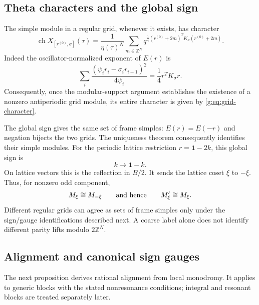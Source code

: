 \documentclass[11pt,a4paper]{article}
\numberwithin{equation}{section}
\theoremstyle{definition}\newtheorem{definition}[theorem]{Definition}
\theoremstyle{remark}\newtheorem{remark}[theorem]{Remark}
\begin{document}
\subsection{Theta characters and the global sign}
The simple module in a regular grid, whenever it exists, has character
\begin{equation}
 \boxed{\qquad
 \operatorname{ch}X_{[r^{(0)},\sigma]}(\tau)
    =\frac1{\eta(\tau)^N}
      \sum_{m\in\mathbb Z^N}
       q^{\frac14(r^{(0)}+2m)^TK_\sigma(r^{(0)}+2m)}.
 \qquad}                                                     \label{g:eq:grid-character}
\end{equation}
Indeed the oscillator-normalized exponent of $E(r)$ is
\[
 \sum_i\frac{(\psi_i r_i-\sigma_i r_{i+1})^2}{4\psi_i}
                         =\frac14r^TK_\sigma r.
\]
Consequently, once the modular-support argument establishes the
existence of a nonzero antiperiodic grid module, its entire character
is given by \eqref{g:eq:grid-character}.

The global sign gives the same set of frame simples:
$E(r)=E(-r)$ and negation bijects the two grids. The uniqueness
theorem consequently identifies their simple modules. For the
periodic lattice restriction $r=\mathbf1-2k$, this global sign is
\[
                       k\longmapsto\mathbf1-k.
\]
On lattice vectors this is the reflection in $B/2$.
It sends the lattice coset $\xi$ to $-\xi$. Thus, for nonzero odd
component,
\[
                 M_\xi\cong M_{-\xi}
                 \qquad\hbox{and hence}\qquad M_\xi'\cong M_\xi.
\]
Different regular grids can agree as sets of frame simples only
under the sign/gauge identifications described next. A coarse label
alone does not identify different parity lifts modulo $2\mathbb Z^N$.

\subsection{Alignment and canonical sign gauges}
The next proposition derives rational alignment from local
monodromy.  It applies to generic blocks with the stated
nonresonance conditions; integral and resonant blocks are treated
separately later.
\end{document}
